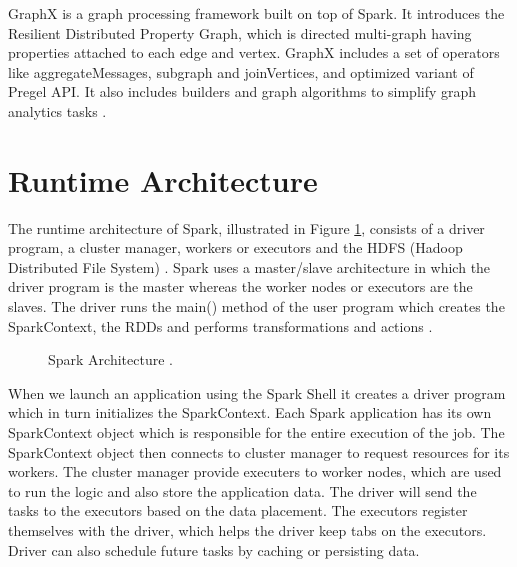\documentclass[9pt,twocolumn,twoside]{../../styles/osajnl}
\begin{document}
GraphX is a graph processing framework built on top of Spark. It
introduces the Resilient Distributed Property Graph, which is directed
multi-graph having properties attached to each edge and vertex. GraphX
includes a set of operators like aggregateMessages, subgraph and
joinVertices, and optimized variant of Pregel API. It also includes
builders and graph algorithms to simplify graph analytics tasks
\cite{article-spark-1}.

\section{Runtime Architecture}

The runtime architecture of Spark, illustrated in Figure
\ref{fig:spark-runtime}, consists of a driver program, a cluster
manager, workers or executors and the HDFS (Hadoop Distributed File
System) \cite{article-spark-1}.  Spark uses a master/slave
architecture in which the driver program is the master whereas the
worker nodes or executors are the slaves. The driver runs the main()
method of the user program which creates the SparkContext, the RDDs
and performs transformations and actions \cite{book-spark}.

\begin{figure}[htbp]
\centering
{}
\caption{Spark Architecture \cite{www-spark-cluster}.}
\label{fig:spark-runtime}
\end{figure}

When we launch an application using the Spark Shell it creates a
driver program which in turn initializes the SparkContext. Each Spark
application has its own SparkContext object which is responsible for
the entire execution of the job. The SparkContext object then connects
to cluster manager to request resources for its workers. The cluster
manager provide executers to worker nodes, which are used to run the
logic and also store the application data. The driver will send the
tasks to the executors based on the data placement. The executors
register themselves with the driver, which helps the driver keep tabs
on the executors. Driver can also schedule future tasks by caching or
persisting data.
\end{document}
